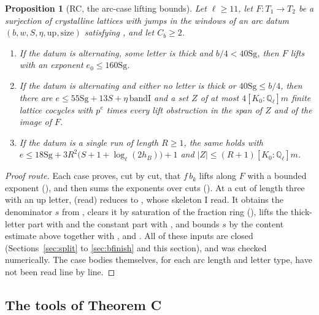 \documentclass[11pt]{article}
\newcommand{\Sg}{\mathrm{Sg}}
\newtheorem{prop}[lemma]{Proposition}
\theoremstyle{definition}
\theoremstyle{remark}
\begin{document}
\begin{prop}[RC, the arc-case lifting bounds]\label{prop:RC}
Let $\ell\ge11$, let $F\colon T_1\to T_2$ be a surjection of crystalline lattices with jumps in the windows of an arc datum $(b,w,S,\eta,\mathrm{up},\mathrm{size})$ satisfying , and let $C_b\ge2$.
\begin{enumerate}[label=(\roman*),itemsep=1pt]
\item If the datum is alternating, some letter is thick and $b/4<40\Sg$, then $F$ lifts with an exponent $e_0\le160\Sg$.
\item If the datum is alternating and either no letter is thick or $40\Sg\le b/4$, then there are $e\le55\Sg+13S+\eta\,\mathrm{bandI}$ and a set $Z$ of at most $4[K_0:\mathbb Q_\ell]m$ finite lattice cocycles with $p^e$ times every lift obstruction in the span of $Z$ and of the image of $F$.
\item If the datum is a single run of length $R\ge1$, the same holds with $e\le18\Sg+3R^2\bigl(S+1+\log_\ell(2h_B)\bigr)+1$ and $\lvert Z\rvert\le(R+1)[K_0:\mathbb Q_\ell]m$.
\end{enumerate}
\end{prop}

\begin{proof}[Proof route]
Each case proves, cut by cut, that $f\,b_k$ lifts along $F$ with a bounded exponent (), and then sums the exponents over cuts (). At a cut of length three with an up letter,  (read) reduces to , whose skeleton I read. It obtains the denominator $s$ from , clears it by saturation of the fraction ring (), lifts the thick-letter part with  and the constant part with , and bounds $s$ by the content estimate above together with ,  and . All of these inputs are closed (Sections~\ref{sec:split} to \ref{sec:bfinish} and this section), and  was checked numerically. The case bodies themselves, for each arc length and letter type, have not been read line by line.
\end{proof}

\subsection*{The tools of Theorem C}
\end{document}
